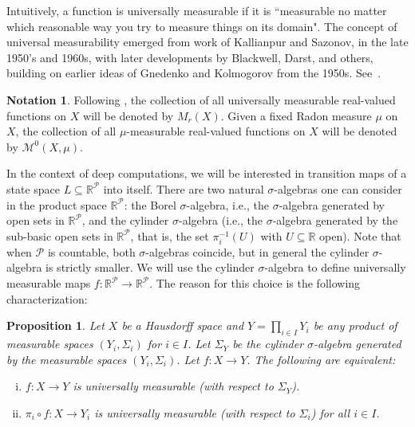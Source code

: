 \documentclass[psamsfonts]{amsart}
\newtheorem{prop}[thm]{Proposition}
\theoremstyle{definition}
\newtheorem{notn}[thm]{Notation}
\theoremstyle{remark}
\numberwithin{equation}{section}
\begin{document}
Intuitively,  a function is universally measurable if it is ``measurable no matter which reasonable way you try to measure things on its domain".
The concept of universal measurability emerged from work of  Kallianpur and Sazonov, in the late 1950's and 1960s, with later developments by Blackwell, Darst, and others, building on earlier ideas of Gnedenko and Kolmogorov from the 1950s.
See~\cite[Chapters 1 and 2]{Pap:2002}.


\begin{notn}
Following \cite{BFT_1978_PCompactBaire}, the collection of all universally measurable real-valued functions on $X$ will be denoted by $M_r(X)$. 
Given a fixed Radon measure $\mu$ on $X$, the collection of all $\mu$-measurable real-valued functions on $X$ will be denoted by $\mathscr{M}^0(X,\mu)$.
\end{notn}

In the context of deep computations, we will be interested in transition maps of a state space $L\subseteq \mathbb{R}^\mathcal{P}$ into itself.
There are two natural $\sigma$-algebras one can consider in the product space $\mathbb{R}^\mathcal{P}$: the Borel $\sigma$-algebra, i.e., the $\sigma$-algebra generated by open sets in $\mathbb{R}^\mathcal{P}$, and the cylinder $\sigma$-algebra (i.e., the $\sigma$-algebra generated by the sub-basic open sets in $\mathbb{R}^\mathcal{P}$, that is, the set $\pi_i^{-1}(U)$ with $U\subseteq \mathbb{R}$ open).
Note that when $\mathcal{P}$ is countable, both $\sigma$-algebras coincide, but in general the cylinder $\sigma$-algebra is strictly smaller.
We will use the cylinder $\sigma$-algebra to define universally measurable maps $f:\mathbb{R}^\mathcal{P}\rightarrow\mathbb{R}^\mathcal{P}$.
The reason for this choice is the following characterization:

\begin{prop}\label{prop:coordinated_univ_meas}
    Let $X$ be a Hausdorff space and $Y=\prod_{i\in I}Y_i$ be any product of measurable spaces $(Y_i,\Sigma_i)$ for $i\in I$.
Let $\Sigma_Y$ be the cylinder $\sigma$-algebra generated by the measurable spaces $(Y_i,\Sigma_i)$.
Let $f:X\rightarrow Y$.
The following are equivalent:
    \begin{enumerate}[(i)]
        \item
        $f:X\rightarrow Y$ is universally measurable (with respect to $\Sigma_Y$).
        \item
        $\pi_i\circ f:X\rightarrow Y_i$ is universally measurable (with respect to $\Sigma_i$) for all $i\in I$.
    \end{enumerate}
\end{prop}
\end{document}
